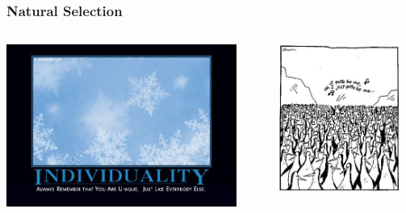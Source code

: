 \documentclass[10pt]{beamer}
\begin{document}
\begin{frame}[t]
\frametitle{Natural Selection}
\vspace{0.5cm}

	\begin{columns}
		\begin{column}{0.7\textwidth}
			\begin{center}
				\includegraphics[width=0.9\textwidth]{figures/individuality.jpg}
			\end{center}
		\end{column}
		
		\begin{column}{0.3\textwidth}
			\begin{center}
				\includegraphics[width=0.9\textwidth]{figures/penguin.jpg}
			\end{center}
		\end{column}
	\end{columns}
\end{frame}
\end{document}
